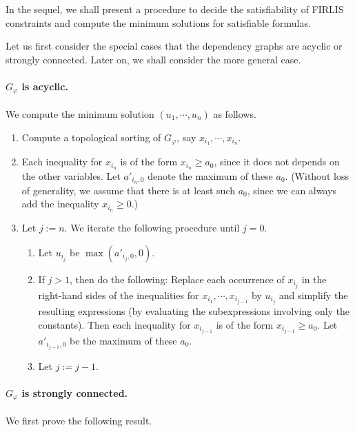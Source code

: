 \documentclass[runningheads]{llncs}
\newcommand\firlis{FIRLIS}
\begin{document}
In the sequel, we shall present a procedure to decide the satisfiability of {\firlis} constraints and compute the minimum solutions for satisfiable formulas. 

Let us first consider the special cases that the dependency graphs are acyclic or strongly connected. Later on, we shall consider the more general case. 

\paragraph*{$G_\varphi$ is acyclic.} We compute the minimum solution $(u_1, \cdots, u_n)$ as follows.  
\begin{enumerate}
\item Compute a topological sorting of $G_\varphi$, say $x_{i_1}, \cdots, x_{i_n}$.  
%
\item Each inequality for $x_{i_n}$ is of the form $x_{i_n} \ge a_{0}$, since it does not depends on the other variables. 
Let $a'_{i_n,0}$ denote the maximum of these $a_0$. (Without loss of generality, we assume that there is at least such $a_0$, since we can always add the inequality $x_{i_n} \ge 0$.) 

\item Let $j := n$. We iterate the following procedure until $j = 0$.
\begin{enumerate}
\item Let $u_{i_j}$ be $\max(a'_{i_j,0},0)$. 

\item If $j > 1$, then do the following: Replace each occurrence of $x_{i_j}$ in the right-hand sides of the inequalities for $x_{i_1}, \cdots, x_{i_{j-1}}$ by $u_{i_j}$ and simplify the resulting expressions (by evaluating the subexpressions involving only the constants). Then each inequality for $x_{i_{j-1}}$ is of the form $x_{i_{j-1}} \ge a_0$. Let $a'_{i_{j-1},0}$ be the maximum of these $a_0$. 
\item Let $j := j-1$.
\end{enumerate}
%
\end{enumerate}

\paragraph*{$G_\varphi$ is strongly connected.} We first prove the following result. 
\end{document}
